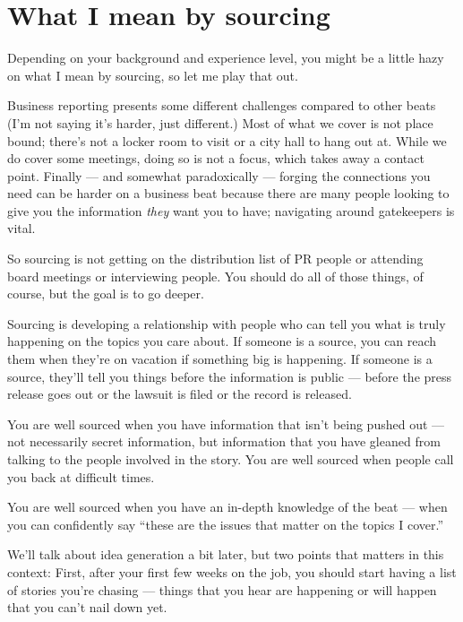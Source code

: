 \documentclass[
  11pt,
  american,
  letterpaperpaper,
  extrafontsizes,onecolumn,openright
  ]{memoir}
\begin{document}
\hypertarget{what-i-mean-by-sourcing}{%
\section*{What I mean by sourcing}\label{what-i-mean-by-sourcing}}

Depending on your background and experience level, you might be a little hazy on what I mean by sourcing, so let me play that out.

Business reporting presents some different challenges compared to other beats (I'm not saying it's harder, just different.) Most of what we cover is not place bound; there's not a locker room to visit or a city hall to hang out at. While we do cover some meetings, doing so is not a focus, which takes away a contact point. Finally --- and somewhat paradoxically --- forging the connections you need can be harder on a business beat because there are many people looking to give you the information \emph{they} want you to have; navigating around gatekeepers is vital.

So sourcing is not getting on the distribution list of PR people or attending board meetings or interviewing people. You should do all of those things, of course, but the goal is to go deeper.

Sourcing is developing a relationship with people who can tell you what is truly happening on the topics you care about. If someone is a source, you can reach them when they're on vacation if something big is happening. If someone is a source, they'll tell you things before the information is public --- before the press release goes out or the lawsuit is filed or the record is released.

You are well sourced when you have information that isn't being pushed out --- not necessarily secret information, but information that you have gleaned from talking to the people involved in the story. You are well sourced when people call you back at difficult times.

You are well sourced when you have an in-depth knowledge of the beat --- when you can confidently say \enquote{these are the issues that matter on the topics I cover.}

We'll talk about idea generation a bit later, but two points that matters in this context: First, after your first few weeks on the job, you should start having a list of stories you're chasing --- things that you hear are happening or will happen that you can't nail down yet.
\end{document}
